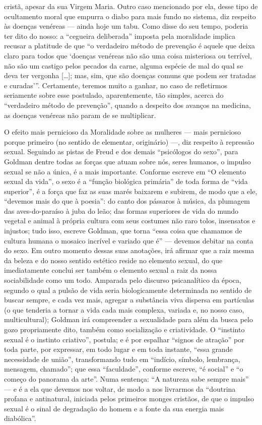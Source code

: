 cristã, apesar da sua Virgem Maria. Outro caso mencionado por ela, desse
tipo de ocultamento moral que empurra o diabo para mais fundo no
sistema, diz respeito às doenças venéreas --- ainda hoje um tabu. Como
disse do seu tempo, poderia ter dito do nosso: a ``cegueira deliberada''
imposta pela moralidade implica recusar a platitude de que ``o
verdadeiro método de prevenção é aquele que deixa claro para todos que
`doenças venéreas não são uma coisa misteriosa ou terrível, não são um
castigo pelos pecados da carne, alguma espécie de mal do qual se deva
ter vergonha {[}\ldots{]}; mas, sim, que são doenças comuns que podem ser
tratadas e curadas'''. Certamente, teremos muito a ganhar, no caso de
refletirmos seriamente sobre esse postulado, aparentemente, tão simples,
acerca do ``verdadeiro método de prevenção'', quando a despeito dos
avanços na medicina, as doenças venéreas não param de se multiplicar.

O efeito mais pernicioso da Moralidade sobre as mulheres --- mais
pernicioso porque primeiro (no sentido de elementar, originário) ---, diz
respeito à repressão sexual. Seguindo as pistas de Freud e dos demais
``psicólogos do sexo'', para Goldman dentre todas as forças que atuam
sobre nós, seres humanos, o impulso sexual se não a única, é a mais
importante. Conforme escreve em ``O elemento sexual da vida'', o sexo é
a ``função biológica primária'' de toda forma de ``vida superior'', é a
força que faz as suas marés baixarem e subirem, de modo que a ele,
``devemos mais do que à poesia'': do canto dos pássaros à música, da
plumagem das aves-do-paraíso à juba do leão; das formas superiores de
vida do mundo vegetal e animal à própria cultura com seus costumes não
raro tolos, insensatos e injustos; tudo isso, escreve Goldman, que torna
``essa coisa que chamamos de cultura humana o mosaico incrível e variado
que é'' --- devemos debitar na conta do sexo. Em outro momento dessas
suas anotações, irá afirmar que a raiz mesma da beleza e do nosso
sentido estético reside no elemento sexual, do que imediatamente conclui
ser também o elemento sexual a raiz da nossa sociabilidade como um todo.
Amparada pelo discurso psicanalítico da época, segundo o qual a pulsão
de vida seria biologicamente determinada no sentido de buscar sempre, e
cada vez mais, agregar a substância viva dispersa em partículas (o que
tenderia a tornar a vida cada mais complexa, variada e, no nosso caso,
multicultural); Goldman irá compreender a sexualidade para além da busca
pelo gozo propriamente dito, também como socialização e criatividade. O
``instinto sexual é o instinto criativo'', postula; e é por espalhar
``signos de atração'' por toda parte, por expressar, em todo lugar e em
toda instante, ``essa grande necessidade de união'', transformando tudo
em ``indício, símbolo, lembrança, mensagem, chamado''; que essa
``faculdade'', conforme escreve, ``é social'' e ``o começo do panorama
da arte''. Numa sentença: ``A natureza sabe sempre mais'' --- e é a ela
que devemos nos voltar, de modo a nos livrarmos da ``doutrina profana e
antinatural, iniciada pelos primeiros monges cristãos, de que o impulso
sexual é o sinal de degradação do homem e a fonte da sua energia mais
diabólica''.

